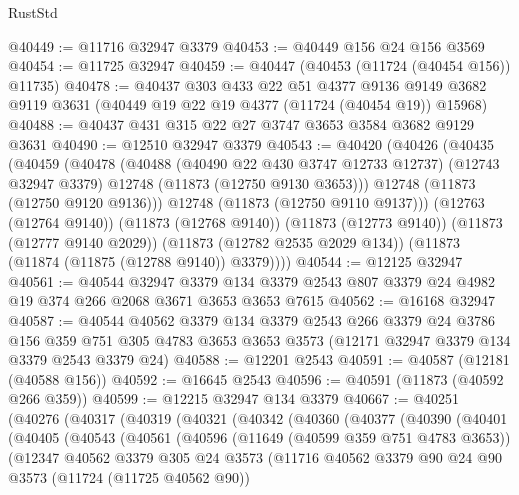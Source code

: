 \begin{lexlean}{RustStd}
\begin{coremodule}
@40449 := @11716 @32947 @3379
@40453 := @40449 @156 @24 @156 @3569
@40454 := @11725 @32947
@40459 := @40447 (@40453 (@11724 (@40454 @156)) @11735)
@40478 := @40437
    @303
    @433
    @22
    @51
    @4377
    @9136
    @9149
    @3682
    @9119
    @3631
    (@40449 @19 @22 @19 @4377 (@11724 (@40454 @19)) @15968)
@40488 := @40437 @431 @315 @22 @27 @3747 @3653 @3584 @3682 @9129 @3631
@40490 := @12510 @32947 @3379
@40543 := @40420
    (@40426
      (@40435
        (@40459
          (@40478
            (@40488
              (@40490 @22 @430 @3747 @12733 @12737)
              (@12743 @32947 @3379)
              @12748
              (@11873 (@12750 @9130 @3653)))
            @12748
            (@11873 (@12750 @9120 @9136)))
          @12748
          (@11873 (@12750 @9110 @9137)))
        (@12763 (@12764 @9140))
        (@11873 (@12768 @9140))
        (@11873 (@12773 @9140))
        (@11873 (@12777 @9140 @2029))
        (@11873 (@12782 @2535 @2029 @134))
        (@11873 (@11874 (@11875 (@12788 @9140)) @3379))))
@40544 := @12125 @32947
@40561 := @40544
    @32947
    @3379
    @134
    @3379
    @2543
    @807
    @3379
    @24
    @4982
    @19
    @374
    @266
    @2068
    @3671
    @3653
    @3653
    @7615
@40562 := @16168 @32947
@40587 := @40544
    @40562
    @3379
    @134
    @3379
    @2543
    @266
    @3379
    @24
    @3786
    @156
    @359
    @751
    @305
    @4783
    @3653
    @3653
    @3573
    (@12171 @32947 @3379 @134 @3379 @2543 @3379 @24)
@40588 := @12201 @2543
@40591 := @40587 (@12181 (@40588 @156))
@40592 := @16645 @2543
@40596 := @40591 (@11873 (@40592 @266 @359))
@40599 := @12215 @32947 @134 @3379
@40667 := @40251
    (@40276
      (@40317
        (@40319
          (@40321
            (@40342
              (@40360
                (@40377
                  (@40390
                    (@40401
                      (@40405
                        (@40543
                          (@40561
                            (@40596
                              (@11649 (@40599 @359 @751 @4783 @3653))
                              (@12347
                                @40562
                                @3379
                                @305
                                @24
                                @3573
                                (@11716
                                  @40562
                                  @3379
                                  @90
                                  @24
                                  @90
                                  @3573
                                  (@11724 (@11725 @40562 @90))

\end{coremodule}
\end{lexlean}
